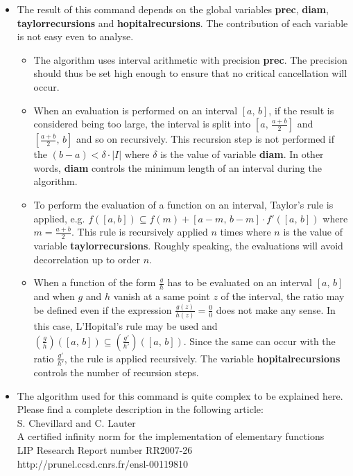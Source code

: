 \begin{itemize}
\item The result of this command depends on the global variables \textbf{prec}, \textbf{diam},
   \textbf{taylorrecursions} and \textbf{hopitalrecursions}. The contribution of each variable is 
   not easy even to analyse.
   \begin{itemize}
   \item The algorithm uses interval arithmetic with precision \textbf{prec}. The
     precision should thus be set high enough to ensure that no critical
     cancellation will occur.
   \item When an evaluation is performed on an interval $[a,\,b]$, if the result
     is considered being too large, the interval is split into $[a,\,\frac{a+b}{2}]$
     and $[\frac{a+b}{2},\,b]$ and so on recursively. This recursion step
     is  not performed if the $(b-a) < \delta \cdot |I|$ where $\delta$ is the value
     of variable \textbf{diam}. In other words, \textbf{diam} controls the minimum length of an
     interval during the algorithm.
   \item To perform the evaluation of a function on an interval, Taylor's rule is
     applied, e.g. $f([a,b]) \subseteq f(m) + [a-m,\,b-m] \cdot f'([a,\,b])$
     where $m=\frac{a+b}{2}$. This rule is recursively applied $n$ times
     where $n$ is the value of variable \textbf{taylorrecursions}. Roughly speaking,
     the evaluations will avoid decorrelation up to order $n$.
   \item When a function of the form $\frac{g}{h}$ has to be evaluated on an
     interval $[a,\,b]$ and when $g$ and $h$ vanish at a same point
     $z$ of the interval, the ratio may be defined even if the expression
     $\frac{g(z)}{h(z)}=\frac{0}{0}$ does not make any sense. In this case, L'Hopital's rule
     may be used and $\left(\frac{g}{h}\right)([a,\,b]) \subseteq \left(\frac{g'}{h'}\right)([a,\,b])$.
     Since the same can occur with the ratio $\frac{g'}{h'}$, the rule is applied
     recursively. The variable \textbf{hopitalrecursions} controls the number of 
     recursion steps.
   \end{itemize}

\item The algorithm used for this command is quite complex to be explained here. 
   Please find a complete description in the following article:\\
        S. Chevillard and C. Lauter\\
        A certified infinity norm for the implementation of elementary functions\\
        LIP Research Report number RR2007-26\\
        http://prunel.ccsd.cnrs.fr/ensl-00119810\\


\end{itemize}
